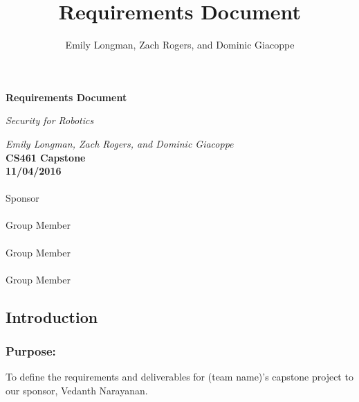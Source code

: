 \documentclass[IEEEtran,letterpaper,10pt,titlepage,draftclsnofoot,onecolumn]{article}
\title{Requirements Document}
\author{Emily Longman, Zach Rogers, and Dominic Giacoppe}
\begin{document}
\begin{titlepage}
  \begin{center}
    \vspace*{1cm}

    \huge
    \textbf{Requirements Document}
  \vspace{0.5cm}

    \textit{Security for Robotics}\\
  \vspace{0.5cm}

    \textit{Emily Longman, Zach Rogers, and Dominic Giacoppe}\\
  \vspace{0.5cm}
    \vfill
    \large
    \textbf{CS461 Capstone}\\
  \vspace{5mm}
    \textbf{11/04/2016}\\

  \vspace{2in}
  \makebox[2.5in]{\hrulefill} \hspace {1.0in}\makebox[2.5in]{\hrulefill} \\
  Sponsor  \\

  \vspace{.2in}
  \makebox[2.5in]{\hrulefill} \hspace {1.0in}\makebox[2.5in]{\hrulefill} \\
  Group Member  \\

  \vspace{.2in}
  \makebox[2.5in]{\hrulefill} \hspace {1.0in}\makebox[2.5in]{\hrulefill} \\
  Group Member  \\

  \vspace{.2in}
  \makebox[2.5in]{\hrulefill} \hspace {1.0in}\makebox[2.5in]{\hrulefill} \\
  Group Member  \\

    \vfill
    \end{center}
\end{titlepage}

\subsection*{Introduction}

\subsubsection*{Purpose:}
To define the requirements and deliverables for (team name)'s capstone project to our sponsor, Vedanth Narayanan.
\end{document}
